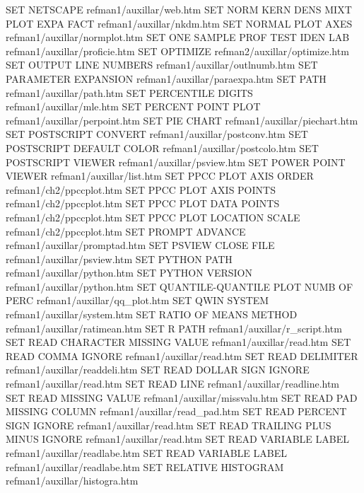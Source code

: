 SET NETSCAPE                            refman1/auxillar/web.htm
SET NORM KERN DENS MIXT PLOT EXPA FACT  refman1/auxillar/nkdm.htm
SET NORMAL PLOT AXES                    refman1/auxillar/normplot.htm
SET ONE SAMPLE PROF TEST IDEN LAB       refman1/auxillar/proficie.htm
SET OPTIMIZE                            refman2/auxillar/optimize.htm
SET OUTPUT LINE NUMBERS                 refman1/auxillar/outlnumb.htm
SET PARAMETER EXPANSION                 refman1/auxillar/paraexpa.htm
SET PATH                                refman1/auxillar/path.htm
SET PERCENTILE DIGITS                   refman1/auxillar/mle.htm
SET PERCENT POINT PLOT                  refman1/auxillar/perpoint.htm
SET PIE CHART                           refman1/auxillar/piechart.htm
SET POSTSCRIPT CONVERT                  refman1/auxillar/postconv.htm
SET POSTSCRIPT DEFAULT COLOR            refman1/auxillar/postcolo.htm
SET POSTSCRIPT VIEWER                   refman1/auxillar/psview.htm
SET POWER POINT VIEWER                  refman1/auxillar/list.htm
SET PPCC PLOT AXIS ORDER                refman1/ch2/ppccplot.htm
SET PPCC PLOT AXIS POINTS               refman1/ch2/ppccplot.htm
SET PPCC PLOT DATA POINTS               refman1/ch2/ppccplot.htm
SET PPCC PLOT LOCATION SCALE            refman1/ch2/ppccplot.htm
SET PROMPT ADVANCE                      refman1/auxillar/promptad.htm
SET PSVIEW CLOSE FILE                   refman1/auxillar/psview.htm
SET PYTHON PATH                         refman1/auxillar/python.htm
SET PYTHON VERSION                      refman1/auxillar/python.htm
SET QUANTILE-QUANTILE PLOT NUMB OF PERC refman1/auxillar/qq_plot.htm
SET QWIN SYSTEM                         refman1/auxillar/system.htm
SET RATIO OF MEANS METHOD               refman1/auxillar/ratimean.htm
SET R PATH                              refman1/auxillar/r_script.htm
SET READ CHARACTER MISSING VALUE        refman1/auxillar/read.htm
SET READ COMMA IGNORE                   refman1/auxillar/read.htm
SET READ DELIMITER                      refman1/auxillar/readdeli.htm
SET READ DOLLAR SIGN IGNORE             refman1/auxillar/read.htm
SET READ LINE                           refman1/auxillar/readline.htm
SET READ MISSING VALUE                  refman1/auxillar/missvalu.htm
SET READ PAD MISSING COLUMN             refman1/auxillar/read_pad.htm
SET READ PERCENT SIGN IGNORE            refman1/auxillar/read.htm
SET READ TRAILING PLUS MINUS IGNORE     refman1/auxillar/read.htm
SET READ VARIABLE LABEL                 refman1/auxillar/readlabe.htm
SET READ VARIABLE LABEL                 refman1/auxillar/readlabe.htm
SET RELATIVE HISTOGRAM                  refman1/auxillar/histogra.htm
